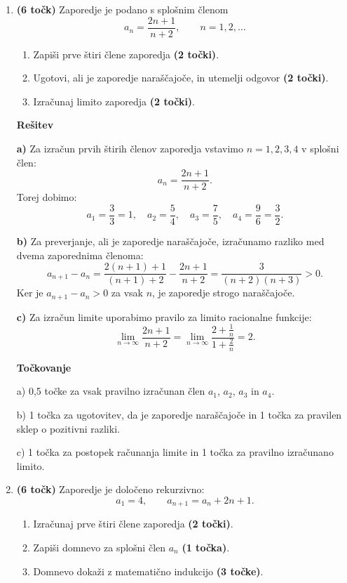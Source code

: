 \documentclass[a4paper,12pt]{article}
\begin{document}
\begin{enumerate}
\vspace{1em}
\clearpage
\item \textbf{(6 točk)} Zaporedje je podano s splošnim členom
\[
 a_n=\frac{2n+1}{n+2}, \qquad n=1,2,\ldots
\]
\begin{enumerate}[label=\alph*)]
  \item Zapiši prve štiri člene zaporedja \textbf{(2 točki)}.
  \item Ugotovi, ali je zaporedje naraščajoče, in utemelji odgovor \textbf{(2 točki)}.
  \item Izračunaj limito zaporedja \textbf{(2 točki)}.
\end{enumerate}

\vspace{0.5em}

\textbf{\large Rešitev}

\textbf{a)}
Za izračun prvih štirih členov zaporedja vstavimo $n=1,2,3,4$ v splošni člen:
\[
 a_n=\frac{2n+1}{n+2}.
\]
Torej dobimo:
\[
 a_1=\frac{3}{3}=1,
 \quad
 a_2=\frac{5}{4},
 \quad
 a_3=\frac{7}{5},
 \quad
 a_4=\frac{9}{6}=\frac{3}{2}.
 \]

\textbf{b)}
Za preverjanje, ali je zaporedje naraščajoče, izračunamo razliko med dvema zaporednima členoma:
\[
 a_{n+1}-a_n
 =\frac{2(n+1)+1}{(n+1)+2}-\frac{2n+1}{n+2}
 =\frac{3}{(n+2)(n+3)}>0.
\]
Ker je $a_{n+1}-a_n>0$ za vsak $n$, je zaporedje strogo naraščajoče.


\textbf{c)}
Za izračun limite uporabimo pravilo za limito racionalne funkcije:
\[
\lim_{n\to\infty}\frac{2n+1}{n+2}=\lim_{n\to\infty}\frac{2+\frac1n}{1+\frac2n}=2.
\]

\vspace{0.5em}
\textbf{\large Točkovanje}

 a) 0,5 točke za vsak pravilno izračunan člen $a_1$, $a_2$, $a_3$ in $a_4$.

 \medskip

 b) 1 točka za ugotovitev, da je zaporedje naraščajoče in 1 točka za pravilen sklep o pozitivni razliki.

 \medskip

 c) 1 točka za postopek računanja limite in 1 točka za pravilno izračunano limito.

\vspace{1em}
\clearpage
\item \textbf{(6 točk)} Zaporedje je določeno rekurzivno:
\[
 a_1=4, \qquad a_{n+1}=a_n+2n+1.
\]
\begin{enumerate}[label=\alph*)]
  \item Izračunaj prve štiri člene zaporedja \textbf{(2 točki)}.
  \item Zapiši domnevo za splošni člen $a_n$ \textbf{(1 točka)}.
  \item Domnevo dokaži z matematično indukcijo \textbf{(3 točke)}.
\end{enumerate}


\end{enumerate}
\end{document}
